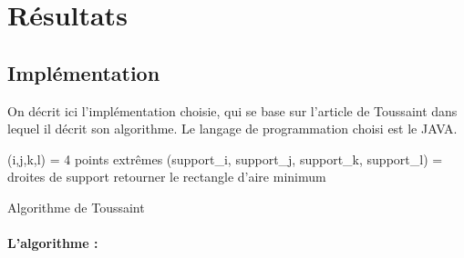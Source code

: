 \documentclass[11pt]{report}
\begin{document}
\section{Résultats}
\subsection{Implémentation}
On décrit ici l'implémentation choisie, qui se base sur l'article de Toussaint dans lequel il décrit son algorithme. Le langage de programmation choisi est le JAVA.
\newline 
\begin{algorithm}[H]
\SetAlgoLined
 (i,j,k,l) = 4 points extrêmes\;
 (support\_i, support\_j, support\_k, support\_l) = droites de support\;
retourner le rectangle d'aire minimum\;

\caption{Algorithme de Toussaint}
\end{algorithm}
\paragraph{L'algorithme : }
\end{document}
